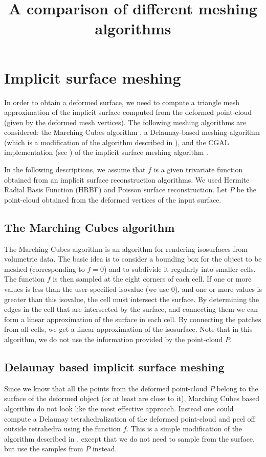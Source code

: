 \documentclass{article}
\title{A comparison of different meshing algorithms}
\begin{document}
\maketitle 
\section{Implicit surface meshing}
In order to obtain a deformed surface, we need to compute a triangle mesh approximation of the implicit surface computed from the deformed point-cloud (given by the deformed mesh vertices). The following meshing algorithms are considered: the Marching Cubes algorithm \cite{LC87}, a Delaunay-based meshing algorithm (which is a modification of the algorithm described in \cite{FP12}), and the CGAL implementation (see \cite{RY07, CGAL}) of the implicit surface meshing algorithm \cite{BO05}.

In the following descriptions, we assume that $f$ is a given trivariate function obtained from an implicit surface reconstruction algorithms. We used Hermite Radial Basis Function (HRBF) and Poisson surface reconstruction. 
Let $P$ be the point-cloud obtained from the deformed vertices of the input surface.

\subsection{The Marching Cubes algorithm}
The Marching Cubes algorithm is an algorithm for rendering isosurfaces from volumetric data. The basic idea is to consider a bounding box for the object to be meshed (corresponding to $f=0$) and to subdivide it regularly into smaller cells. 
The function $f$ is then sampled at the eight corners of each cell. If one or more values is less than the user-specified isovalue (we use $0$), and one or more values is greater than this isovalue, the cell must intersect the surface. By determining the edges in the cell that are intersected by the surface, and connecting them we can form a linear approximation of the surface in each cell. By connecting the patches from all cells, we get a linear approximation of the isosurface.
Note that in this algorithm, we do not use the information provided by the point-cloud $P$.
 
\subsection{Delaunay based implicit surface meshing}
Since we know that all the points from the deformed point-cloud $P$ belong to the surface of the deformed object (or at least are close to it), Marching Cubes based algorithm do not look like the most effective approach. Instead one could compute a Delaunay tetrahedralization of the deformed point-cloud and peel off outside tetrahedra using the function $f$. This is a simple modification of the algorithm described in \cite{FP12}, except that we do not need to sample from the surface, but use the samples from $P$ instead.
\end{document}
